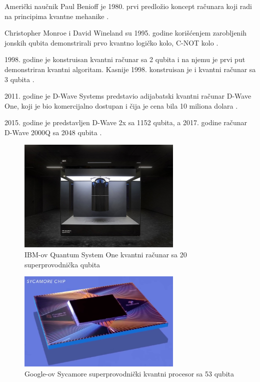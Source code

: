 \documentclass[fleqn, 12pt]{article}
\begin{document}
\begin{text}
Američki naučnik Paul Benioff je 1980. prvi predložio koncept računara koji radi na principima kvantne mehanike \cite{G7}. 

Christopher Monroe i David Wineland su 1995. godine korišćenjem zarobljenih jonskih qubita demonstrirali prvo kvantno logičko kolo, C-NOT kolo \cite{G7}. 

1998. godine je konstruisan kvantni računar sa 2 qubita i na njemu je prvi put demonstriran kvantni algoritam. Kasnije 1998. konstruisan je i kvantni računar sa 3 qubita \cite{G7}. 

2011. godine je D-Wave Systems predstavio adijabatski kvantni računar D-Wave One, koji je bio komercijalno dostupan i čija je cena bila 10 miliona dolara \cite{G7}. 

2015. godine je predstavljen D-Wave 2x sa 1152 qubita, a 2017. godine računar D-Wave 2000Q sa 2048 qubita \cite{G7}. 
\end{text}

\newpage

\begin{figure}[h!]
  \centering
  \includegraphics[width=0.7\textwidth]{IBM_Q_system_(Fraunhofer_2).jpg}
  \caption{IBM-ov Quantum System One kvantni računar sa 20 superprovodnička qubita}
\end{figure}

\begin{figure}[h!]
  \centering
  \includegraphics[width=0.7\textwidth]{Google_Sycamore_Chip_002.png}
  \caption{Google-ov Sycamore superprovodnički kvantni procesor sa 53 qubita}
\end{figure}
\end{document}
